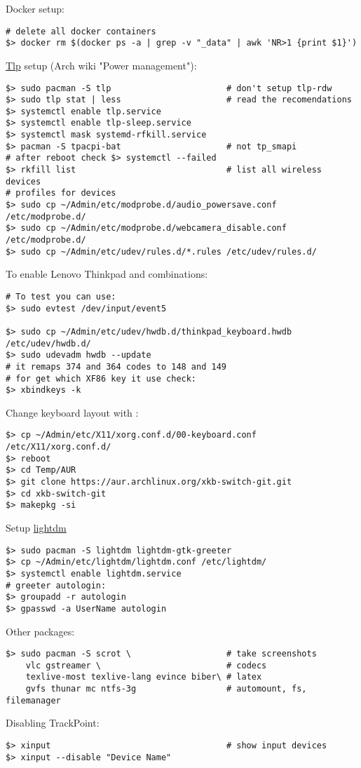 \documentclass[a4paper, 12pt]{article}
\begin{document}
Docker setup:
\begin{lstlisting}
# delete all docker containers
$> docker rm $(docker ps -a | grep -v "_data" | awk 'NR>1 {print $1}')
\end{lstlisting}

\url{Tlp} setup (Arch wiki "Power management"):
\begin{lstlisting}
$> sudo pacman -S tlp                       # don't setup tlp-rdw
$> sudo tlp stat | less                     # read the recomendations
$> systemctl enable tlp.service
$> systemctl enable tlp-sleep.service
$> systemctl mask systemd-rfkill.service
$> pacman -S tpacpi-bat                     # not tp_smapi
# after reboot check $> systemctl --failed
$> rkfill list                              # list all wireless devices
# profiles for devices
$> sudo cp ~/Admin/etc/modprobe.d/audio_powersave.conf /etc/modprobe.d/
$> sudo cp ~/Admin/etc/modprobe.d/webcamera_disable.conf /etc/modprobe.d/
$> sudo cp ~/Admin/etc/udev/rules.d/*.rules /etc/udev/rules.d/
\end{lstlisting}

To enable Lenovo Thinkpad  and  combinations:
\begin{lstlisting}
# To test you can use:
$> sudo evtest /dev/input/event5

$> sudo cp ~/Admin/etc/udev/hwdb.d/thinkpad_keyboard.hwdb /etc/udev/hwdb.d/
$> sudo udevadm hwdb --update
# it remaps 374 and 364 codes to 148 and 149
# for get which XF86 key it use check:
$> xbindkeys -k
\end{lstlisting}

Change keyboard layout with \keyss{\capslock}:
\begin{lstlisting}
$> cp ~/Admin/etc/X11/xorg.conf.d/00-keyboard.conf /etc/X11/xorg.conf.d/
$> reboot
$> cd Temp/AUR
$> git clone https://aur.archlinux.org/xkb-switch-git.git
$> cd xkb-switch-git
$> makepkg -si
\end{lstlisting}

Setup \url{lightdm}
\begin{lstlisting}
$> sudo pacman -S lightdm lightdm-gtk-greeter
$> cp ~/Admin/etc/lightdm/lightdm.conf /etc/lightdm/
$> systemctl enable lightdm.service
# greeter autologin:
$> groupadd -r autologin
$> gpasswd -a UserName autologin
\end{lstlisting}

Other packages:
\begin{lstlisting}
$> sudo pacman -S scrot \                   # take screenshots
    vlc gstreamer \                         # codecs
    texlive-most texlive-lang evince biber\ # latex
    gvfs thunar mc ntfs-3g                  # automount, fs, filemanager
\end{lstlisting}

Disabling TrackPoint:
\begin{lstlisting}
$> xinput                                   # show input devices
$> xinput --disable "Device Name"
\end{lstlisting}
\end{document}
